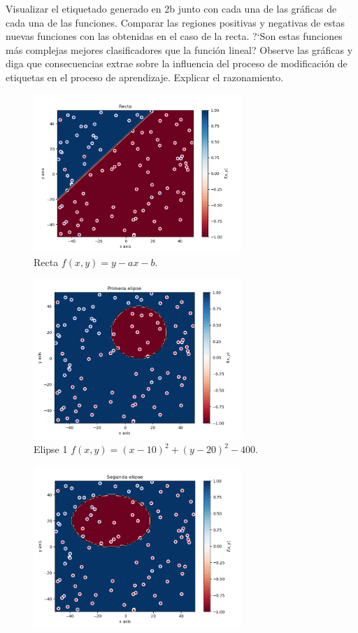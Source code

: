 \documentclass[size=a4, parskip=half, titlepage=false, toc=flat, toc=bib, 12pt]{scrartcl}
\begin{document}
\begin{enumerate}
\begin{enumerate}
Visualizar el etiquetado generado en 2b junto con cada una de las gráficas de cada una
de las funciones. Comparar las regiones positivas y negativas de estas nuevas funciones
con las obtenidas en el caso de la recta. ?`Son estas funciones más complejas mejores
clasificadores que la función lineal? Observe las gráficas y diga que consecuencias
extrae sobre la influencia del proceso de modificación de etiquetas en el proceso de
aprendizaje. Explicar el razonamiento.
\begin{figure}[H]
\centering
\includegraphics[width=0.7\textwidth]{./img/recta}
\caption{Recta $f(x,y) = y - ax - b$.}
\end{figure}
\begin{figure}[H]
\centering
\includegraphics[width=0.7\textwidth]{./img/elipse1}
\caption{Elipse 1 $f(x, y) = (x − 10)^2 + (y − 20)^2 − 400$.}
\end{figure}
\begin{figure}[H]
\centering
\includegraphics[width=0.7\textwidth]{./img/elipse2}

\end{figure}
\end{enumerate}
\end{enumerate}
\end{document}
